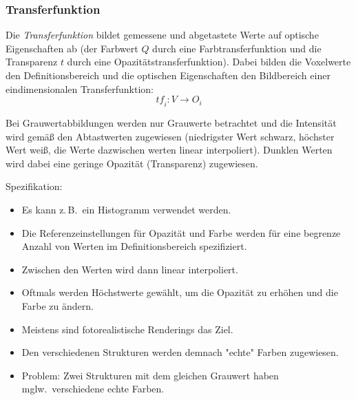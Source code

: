 \documentclass[a4paper, 11pt, accentcolor = tud3b]{tudreport}
\newcommand{\zB}{z.\,B.~}
\newcommand{\mglw}{mglw.~}
\begin{document}
				\subsubsection{Transferfunktion}
					Die \emph{Transferfunktion} bildet gemessene und abgetastete Werte auf optische Eigenschaften ab (der Farbwert \(Q\) durch eine Farbtransferfunktion und die Transparenz \(t\) durch eine Opazitätstransferfunktion). Dabei bilden die Voxelwerte den Definitionsbereich und die optischen Eigenschaften den Bildbereich einer eindimensionalen Transferfunktion:
					\begin{equation*}
						\textit{tf}_i : V \to O_i
					\end{equation*}
					
					Bei Grauwertabbildungen werden nur Grauwerte betrachtet und die Intensität wird gemäß den Abtastwerten zugewiesen (niedrigster Wert schwarz, höchster Wert weiß, die Werte dazwischen werten linear interpoliert). Dunklen Werten wird dabei eine geringe Opazität (Transparenz) zugewiesen.
					
					Spezifikation:
					\begin{itemize}
						\item Es kann \zB ein Histogramm verwendet werden.
						\item Die Referenzeinstellungen für Opazität und Farbe werden für eine begrenze Anzahl von Werten im Definitionsbereich spezifiziert.
						\item Zwischen den Werten wird dann linear interpoliert.
						\item Oftmals werden Höchstwerte gewählt, um die Opazität zu erhöhen und die Farbe zu ändern.
						\item Meistens sind fotorealistische Renderings das Ziel.
						\item Den verschiedenen Strukturen werden demnach "echte" Farben zugewiesen.
						\item Problem: Zwei Strukturen mit dem gleichen Grauwert haben \mglw verschiedene echte Farben.
					\end{itemize}
\end{document}
